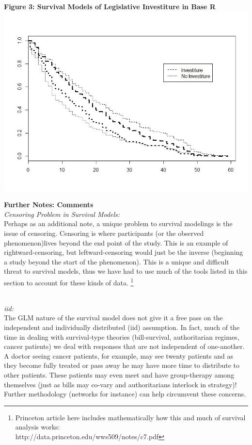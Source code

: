 \documentclass[12pt]{article}\usepackage[]{graphicx}\usepackage[]{color}
\begin{document}
\begin{flushleft}
\begin{center}
\textbf{Figure 3: Survival Models of Legislative Investiture in Base R}
\includegraphics[scale=.6]{SurvR}
\end{center}

\clearpage
\noindent \textbf{Further Notes: Comments}\\
\noindent \textit{Censoring Problem in Survival Models:} \\
Perhaps as an additional note, a unique problem to survival modelings is the issue of censoring. Censoring is where participants (or the observed phenomenon)lives beyond the end point of the study. This is an example of rightward-censoring, but leftward-censoring would just be the inverse (beginning a study beyond the start of the phenomenon). This is a unique and difficult threat to survival models, thus we have had to use much of the tools listed in this section to account for these kinds of data. \footnote{Princeton article here includes mathematically how this and much of survival analysis works:\\
 http://data.princeton.edu/wws509/notes/c7.pdf}

\hfill \\

\noindent \textit{iid:} \\
The GLM nature of the survival model does not give it a free pass on the independent and individually distributed (iid) assumption. In fact, much of the time in dealing with survival-type theories (bill-survival, authoritarian regimes, cancer patients) we deal with responses that are not independent of one-another. A doctor seeing cancer patients, for example, may see twenty patients and as they become fully treated or pass away he may have more time to distribute to other patients. These patients may even meet and have group-therapy among themselves (just as bills may co-vary and authoritarians interlock in strategy)! Further methodology (networks for instance) can help circumvent these concerns.


















\end{flushleft}
\end{document}

